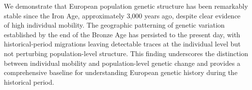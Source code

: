 \documentclass[11pt]{article}
\begin{document}
We demonstrate that European population genetic structure has been remarkably stable since the Iron Age, approximately 3,000 years ago, despite clear evidence of high individual mobility. The geographic patterning of genetic variation established by the end of the Bronze Age has persisted to the present day, with historical-period migrations leaving detectable traces at the individual level but not perturbing population-level structure. This finding underscores the distinction between individual mobility and population-level genetic change and provides a comprehensive baseline for understanding European genetic history during the historical period.



\end{document}
